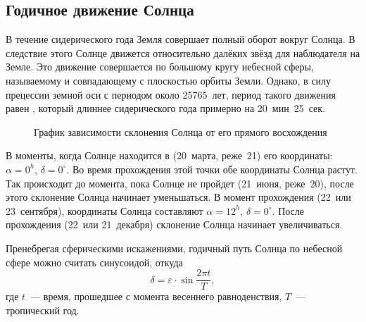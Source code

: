 \subsection{Годичное движение Солнца}
В течение сидерического года Земля совершает полный оборот вокруг Солнца. В следствие этого Солнце движется относительно далёких звёзд для наблюдателя на Земле. Это движение совершается по большому кругу небесной сферы, называемому  и совпадающему с плоскостью орбиты Земли. Однако, в силу прецессии земной оси с периодом около 25765~лет, период такого движения равен , который длиннее сидерического года примерно на 20~мин~25~сек.

\begin{wrapfigure}[12]{r}{0.5\tw}
	\centering
	\vspace{-.9pc}
 	\caption{График зависимости склонения Солнца от его прямого восхождения}
\end{wrapfigure}
В моменты, когда Солнце находится в   (20~марта, реже~21) его координаты: $\alpha=0^h$, $\delta=0^{\circ}$. Во время прохождения этой точки обе координаты Солнца растут. Так происходит до момента, пока Солнце не пройдет  (21~июня, реже~20), после этого склонение Солнца начинает уменьшаться. В момент прохождения  (22~или 23~сентября), координаты Солнца составляют $\alpha=12^h$, $\delta=0^{\circ}$. После прохождения  (22~или 21~декабря) склонение Солнца начинает увеличиваться.

Пренебрегая сферическими искажениями, годичный путь Солнца по небесной сфере можно считать синусоидой, откуда 
\begin{equation}
\delta=\varepsilon\cdot\sin \frac{2 \pi t}{T},
\end{equation}
где $t$~--- время, прошедшее с момента весеннего равноденствия, $T$~--- тропический год.

